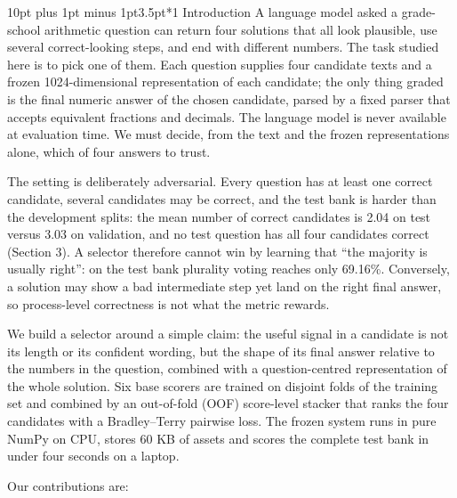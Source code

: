 \documentclass[10pt,a4paper]{article}
\makeatletter
\renewcommand\section{\@startsection{section}{1}{\z@}%
  {10pt plus 1pt minus 1pt}{3.5pt}{\normalfont\large\bfseries}}
\makeatother
\begin{document}
\section*{1 Introduction}
A language model asked a grade-school arithmetic question can return four solutions that all look plausible, use several correct-looking steps, and end with different numbers. The task studied here is to pick one of them. Each question supplies four candidate texts and a frozen 1024-dimensional representation of each candidate; the only thing graded is the final numeric answer of the chosen candidate, parsed by a fixed parser that accepts equivalent fractions and decimals. The language model is never available at evaluation time. We must decide, from the text and the frozen representations alone, which of four answers to trust.

The setting is deliberately adversarial. Every question has at least one correct candidate, several candidates may be correct, and the test bank is harder than the development splits: the mean number of correct candidates is 2.04 on test versus 3.03 on validation, and no test question has all four candidates correct (Section 3). A selector therefore cannot win by learning that ``the majority is usually right'': on the test bank plurality voting reaches only 69.16\%. Conversely, a solution may show a bad intermediate step yet land on the right final answer, so process-level correctness is not what the metric rewards.

We build a selector around a simple claim: the useful signal in a candidate is not its length or its confident wording, but the shape of its final answer relative to the numbers in the question, combined with a question-centred representation of the whole solution. Six base scorers are trained on disjoint folds of the training set and combined by an out-of-fold (OOF) score-level stacker that ranks the four candidates with a Bradley--Terry pairwise loss. The frozen system runs in pure NumPy on CPU, stores 60 KB of assets and scores the complete test bank in under four seconds on a laptop.

Our contributions are:
\end{document}
